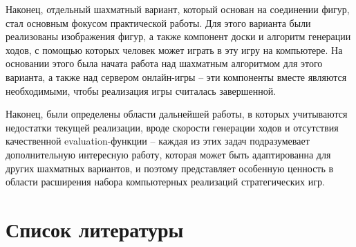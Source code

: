 \documentclass{article}
\begin{document}
Наконец, отдельный шахматный вариант,
который основан на соединении фигур,
стал основным фокусом практической работы.
Для этого варианта были реализованы изображения фигур,
а также компонент доски
и алгоритм генерации ходов,
с помощью которых человек может играть в эту игру на компьютере.
На основании этого была начата работа над шахматным алгоритмом для этого варианта,
а также над сервером онлайн-игры -- 
эти компоненты вместе являются необходимыми, 
чтобы реализация игры считалась завершенной.

Наконец, были определены области дальнейшей работы, 
в которых учитываются недостатки текущей реализации,
вроде скорости генерации ходов и отсутствия качественной evaluation-функции -- 
каждая из этих задач подразумевает дополнительную интересную работу,
которая может быть адаптированна для других шахматных вариантов,
и поэтому представляет особенную ценность в области расширения набора компьютерных
реализаций стратегических игр.

\newpage

\section{Список литературы}

\printbibliography[heading=none]
\end{document}
